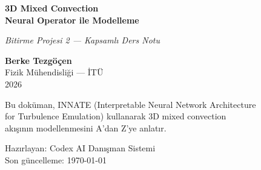 \documentclass[12pt,a4paper]{report}
\theoremstyle{definition}
\begin{document}
\begin{titlepage}
\centering
\vspace*{2cm}

{\Huge\bfseries 3D Mixed Convection\\[0.5cm]
Neural Operator ile Modelleme}

\vspace{1.5cm}

{\Large\textit{Bitirme Projesi 2 — Kapsamlı Ders Notu}}

\vspace{2cm}

{\large
\textbf{Berke Tezgöçen}\\[0.3cm]
Fizik Mühendisliği — İTÜ\\[0.3cm]
2026
}

\vspace{2cm}

{\normalsize
Bu doküman, INNATE (Interpretable Neural Network Architecture\\
for Turbulence Emulation) kullanarak 3D mixed convection\\
akışının modellenmesini A'dan Z'ye anlatır.
}

\vfill
{\small Hazırlayan: Codex AI Danışman Sistemi \\ Son güncelleme: \today}
\end{titlepage}

\tableofcontents
\newpage


















\appendix



\end{document}
